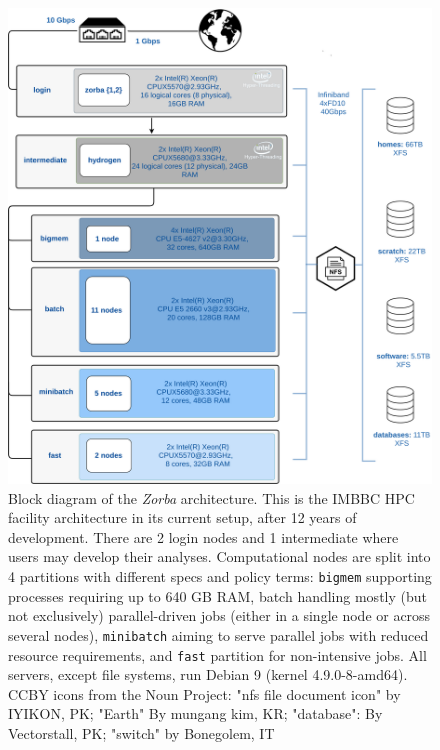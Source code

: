    \begin{figure}
      \centering
      \includegraphics[width=\columnwidth]{figures/zorba_architecture.png}
      \caption[Block diagram of the \textit{Zorba} architecture.]{
         Block diagram of the \textit{Zorba} architecture.
         This is the IMBBC HPC facility architecture in its current setup, after 12 years of development. 
         There are 2 login nodes and 1 intermediate where users may develop their analyses. 
         Computational nodes are split into 4 partitions with different specs and policy terms: 
         \texttt{bigmem} supporting processes requiring up to 640 GB RAM, batch handling mostly 
         (but not exclusively) parallel-driven jobs (either in a single node or across several nodes), 
         \texttt{minibatch} aiming to serve parallel jobs with reduced resource requirements, and \texttt{fast} partition for non-intensive jobs. 
         All servers, except file systems, run Debian 9 (kernel 4.9.0-8-amd64). 
         CCBY icons from the Noun Project: "nfs file document icon" by IYIKON, PK; "Earth" 
         By mungang kim, KR; "database": By Vectorstall, PK; "switch" by Bonegolem, IT
      }
   \end{figure}






